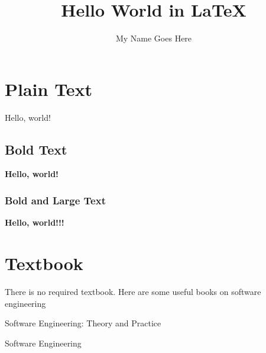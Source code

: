 \documentclass[12pt]{article}
\title{Hello World in LaTeX}
\author{My Name Goes Here}
\begin{document}
\maketitle
\tableofcontents



\section{Plain Text}
Hello, world!
\subsection{Bold Text}
{\bf Hello, world!}
\subsubsection{Bold and Large Text}
{\Large \bf Hello, world!!!}

\section{Textbook}
There is no required textbook. Here are some useful books on software engineering

Software Engineering: Theory and Practice~\cite{pfleeger2010software}

Software Engineering~\cite{sommerville2011software}




\end{document}
